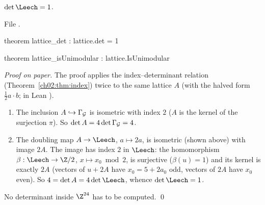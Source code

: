 \begin{theorem}\label{ch02:thm:leechdet}
$\det\Leech=1$.
\end{theorem}
\noindent File .
\begin{leancode}
theorem lattice_det : lattice.det = 1

theorem lattice_isUnimodular : lattice.IsUnimodular
\end{leancode}
\emph{Proof on paper.}  The proof applies the index--determinant relation
(Theorem~\ref{ch02:thm:index}) twice to the same lattice $A$ (with the halved form
$\tfrac12a\cdot b$; in Lean ).
\begin{enumerate}
\item The inclusion $A\hookrightarrow\Gamma_{\mathcal{G}}$ is isometric with index $2$ ($A$ is the
kernel of the surjection $\pi$).  So $\det A=4\det\Gamma_{\mathcal{G}}=4$.
\item The doubling map $A\to\Leech$, $a\mapsto2a$, is isometric (shown above) with image $2A$.
The image has index $2$ in $\Leech$: the homomorphism $\beta:\Leech\to\Z/2$, $x\mapsto
x_0\bmod2$, is surjective ($\beta(u)=1$) and its kernel is exactly $2A$ (vectors of $u+2A$ have
$x_0=5+2a_0$ odd, vectors of $2A$ have $x_0$ even).  So $4=\det A=4\det\Leech$, whence
$\det\Leech=1$.
\end{enumerate}
No determinant inside $\Z^{24}$ has to be computed.  \qed

